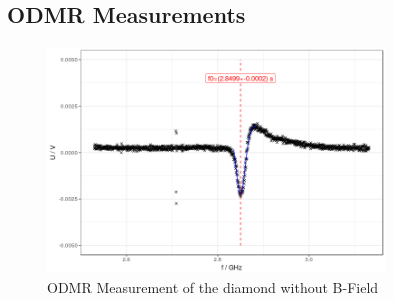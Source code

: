 \subsection{ODMR Measurements}
\begin{figure}
	\centering
	\includegraphics[width=0.8\textwidth]{../figures/odmr-1.png}
	\caption{ODMR Measurement of the diamond without B-Field}
	\label{fig:odmr-no-B}
\end{figure}